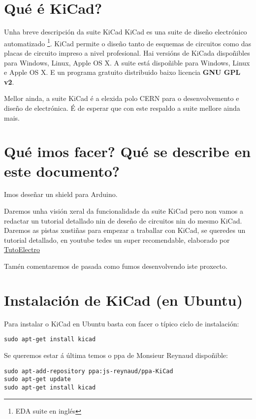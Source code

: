 \section{Qué é KiCad?}\label{quuxe9-uxe9-kicad}

Unha breve descripción da suite KiCad KiCad es una suite de diseño
electrónico automatizado \footnote{EDA suite en inglés}. KiCad permite o
diseño tanto de esquemas de circuitos como das placas de circuito
impreso a nivel profesional. Hai versións de KiCada dispoñibles para
Windows, Linux, Apple OS X. A suite está dispoñible para Windows, Linux
e Apple OS X. E un programa gratuito distribuido baixo licencia
\textbf{GNU GPL v2}.

Mellor ainda, a suite KiCad é a elexida polo CERN para o desenvolvemento
e diseño de electrónica. É de esperar que con este respaldo a suite
mellore ainda mais.

\section{Qué imos facer? Qué se describe en este
documento?}\label{quuxe9-imos-facer-quuxe9-se-describe-en-este-documento}

Imos deseñar un shield para Arduino.

Daremos unha visión xeral da funcionalidade da suite KiCad pero non
vamos a redactar un tutorial detallado nin de deseño de circuitos nin do
mesmo KiCad. Daremos as pistas xustiñas para empezar a traballar con
KiCad, se queredes un tutorial detallado, en youtube tedes un super
recomendable, elaborado por
\href{https://www.youtube.com/playlist?list=PL1Hs_F1k2mdRVYDtdWd7tQKDZTfxop7np}{TutoElectro}

Tamén comentaremos de pasada como fumos desenvolvendo iste proxecto.

\section{Instalación de KiCad (en
Ubuntu)}\label{instalaciuxf3n-de-kicad-en-ubuntu}

Para instalar o KiCad en Ubuntu basta con facer o típico ciclo de
instalación:

\begin{verbatim}
sudo apt-get install kicad
\end{verbatim}

Se queremos estar á última temos o ppa de Monsieur Reynaud dispoñible:

\begin{verbatim}
sudo apt-add-repository ppa:js-reynaud/ppa-KiCad
sudo apt-get update
sudo apt-get install kicad
\end{verbatim}

